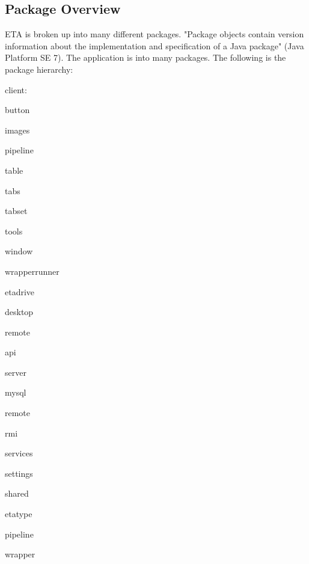 \documentclass[a4paper,12pt]{texMemo}
\begin{document}
\subsection{Package Overview}
ETA is broken up into many different packages. "Package objects contain version information about the implementation and specification of a Java package" (Java Platform SE 7). The application is into many packages. The following is the package hierarchy:
\begin{compactenum}
    \item client:
    \begin{compactenum}
        \item button
        \item images
        \item pipeline
        \item table
        \item tabs
        \item tabset
        \item tools
        \item window
        \item wrapperrunner
    \end{compactenum}
    \item etadrive
    \begin{compactenum}
        \item desktop
    \end{compactenum}
    \item remote
    \begin{compactenum}
        \item api
    \end{compactenum}
    \item server
    \begin{compactenum}
        \item mysql
        \item remote
        \item rmi
        \item services
        \item settings
    \end{compactenum}
    \item shared
    \begin{compactenum}
        \item etatype
        \item pipeline
        \item wrapper
    \end{compactenum}
\end{compactenum}
\end{document}
